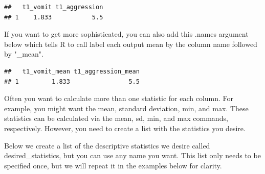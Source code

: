 \documentclass[
]{krantz}
\makeatletter
\newenvironment{Shaded}{\begin{snugshade}}{\end{snugshade}}
\newcommand{\DataTypeTok}[1]{\textcolor[rgb]{0.27,0.27,0.27}{#1}}
\newcommand{\KeywordTok}[1]{\textcolor[rgb]{0.27,0.27,0.27}{\textbf{#1}}}
\newcommand{\NormalTok}[1]{#1}
\newcommand{\OperatorTok}[1]{\textcolor[rgb]{0.43,0.43,0.43}{\textbf{#1}}}
\newcommand{\OtherTok}[1]{\textcolor[rgb]{0.37,0.37,0.37}{#1}}
\newcommand{\StringTok}[1]{\textcolor[rgb]{0.5,0.5,0.5}{#1}}
\newenvironment{kframe}{%
\medskip{}
\setlength{\fboxsep}{.8em}
 \def\at@end@of@kframe{}%
 \ifinner\ifhmode%
  \def\at@end@of@kframe{\end{minipage}}%
  \begin{minipage}{\columnwidth}%
 \fi\fi%
 \def\FrameCommand##1{\hskip\@totalleftmargin \hskip-\fboxsep
 \colorbox{shadecolor}{##1}\hskip-\fboxsep
     \hskip-\linewidth \hskip-\@totalleftmargin \hskip\columnwidth}%
 \MakeFramed {\advance\hsize-\width
   \@totalleftmargin\z@ \linewidth\hsize
   \@setminipage}}%
 {\par\unskip\endMakeFramed%
 \at@end@of@kframe}
\renewenvironment{Shaded}{\begin{kframe}}{\end{kframe}}
\makeatother
\begin{document}
\begin{Shaded}
\end{Shaded}

\begin{verbatim}
##   t1_vomit t1_aggression
## 1    1.833           5.5
\end{verbatim}

If you want to get more sophisticated, you can also add this .names argument below which tells R to call label each output mean by the column name followed by "\_mean".

\begin{Shaded}
\end{Shaded}

\begin{verbatim}
##   t1_vomit_mean t1_aggression_mean
## 1         1.833                5.5
\end{verbatim}

Often you want to calculate more than one statistic for each column. For example, you might want the mean, standard deviation, min, and max. These statistics can be calculated via the mean, sd, min, and max commands, respectively. However, you need to create a list with the statistics you desire.

Below we create a list of the descriptive statistics we desire called desired\_statistics, but you can use any name you want. This list only needs to be specified once, but we will repeat it in the examples below for clarity.
\end{document}
